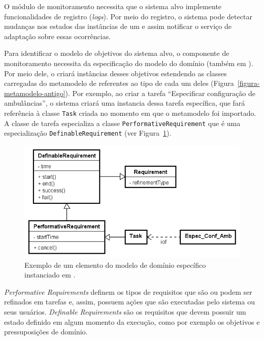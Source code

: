 O módulo de monitoramento necessita que o sistema alvo implemente funcionalidades de registro (\textit{logs}). Por meio do registro, o sistema pode detectar mudanças nos estados das instâncias de um \awreq e assim notificar o serviço de adaptação sobre essas ocorrências. 

Para identificar o modelo de objetivos do sistema alvo, o componente de monitoramento necessita da especificação do modelo do domínio (também em \ecore). Por meio dele, o \zanshin criará instâncias desses objetivos estendendo as classes carregadas do metamodelo de \gore referentes ao tipo de cada um deles (Figura~\ref{figura-metamodelo-antigo}). Por exemplo, ao criar a tarefa ``Especificar configuração de ambulâncias'', o sistema criará uma instancia dessa tarefa específica, que fará referência à classe \texttt{Task} criada no momento em que o metamodelo foi importado. A classe de tarefa especializa a classe \texttt{PerformativeRequirement} que é uma especialização \texttt{DefinableRequirement} (ver Figura~\ref{exemplo-instanciacao-ecore}). 

\begin{figure}
	\centering
	\includegraphics[width=1\textwidth]{figuras/exemplos-emf/exemplo-instanciacao-ecore.PNG}
	\caption{Exemplo de um elemento do modelo de domínio específico instanciado em \zanshin.}
	\label{exemplo-instanciacao-ecore}
\end{figure}

\textit{Performative Requirements} definem os tipos de requisitos que são ou podem ser refinados em tarefas e, assim, possuem ações que são executadas pelo sistema ou seus usuários. \textit{Definable Requirements} são os requisitos que devem possuir um estado definido em algum momento da execução, como por exemplo os objetivos e pressuposições de domínio.

